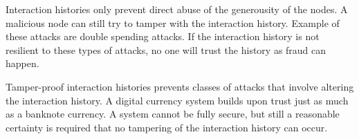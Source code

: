 Interaction histories only prevent direct abuse of the generousity of the nodes.
A malicious node can still try to tamper with the interaction history.
Example of these attacks are double spending attacks.
If the interaction history is not resilient to these types of attacks, 
no one will trust the history as fraud can happen.

Tamper-proof interaction histories prevents classes of attacks that involve altering the interaction history.
A digital currency system builds upon trust just as much as a banknote currency.
A system cannot be fully secure, 
but still a reasonable certainty is required that no tampering of the interaction history can occur.
